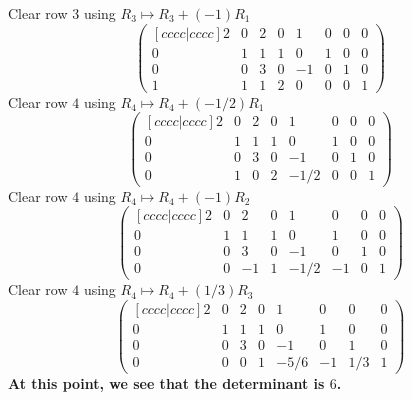 \documentclass{article}
\begin{document}
Clear row \(3\) using \(R_3\mapsto R_3+(-1)R_1\)\[\begin{pmatrix}[ c c
c c | c c c c ] 2 & 0 & 2 & 0 & 1 & 0 & 0 & 0 \\ 0 & 1 & 1 & 1 & 0 & 1
& 0 & 0 \\ 0 & 0 & 3 & 0 & -1 & 0 & 1 & 0 \\ 1 & 1 & 1 & 2 & 0 & 0 & 0
& 1 \end{pmatrix}\]Clear row \(4\) using \(R_4\mapsto
R_4+(-1/2)R_1\)\[\begin{pmatrix}[ c c c c | c c c c ] 2 & 0 & 2 & 0 &
1 & 0 & 0 & 0 \\ 0 & 1 & 1 & 1 & 0 & 1 & 0 & 0 \\ 0 & 0 & 3 & 0 & -1 &
0 & 1 & 0 \\ 0 & 1 & 0 & 2 & -1/2 & 0 & 0 & 1 \end{pmatrix}\]Clear row
\(4\) using \(R_4\mapsto R_4+(-1)R_2\)\[\begin{pmatrix}[ c c c c | c c
c c ] 2 & 0 & 2 & 0 & 1 & 0 & 0 & 0 \\ 0 & 1 & 1 & 1 & 0 & 1 & 0 & 0
\\ 0 & 0 & 3 & 0 & -1 & 0 & 1 & 0 \\ 0 & 0 & -1 & 1 & -1/2 & -1 & 0 &
1 \end{pmatrix}\]Clear row \(4\) using \(R_4\mapsto
R_4+(1/3)R_3\)\[\begin{pmatrix}[ c c c c | c c c c ] 2 & 0 & 2 & 0 & 1
& 0 & 0 & 0 \\ 0 & 1 & 1 & 1 & 0 & 1 & 0 & 0 \\ 0 & 0 & 3 & 0 & -1 & 0
& 1 & 0 \\ 0 & 0 & 0 & 1 & -5/6 & -1 & 1/3 & 1 \end{pmatrix}\] {\bf At
this point, we see that the determinant is \(6\).}
\end{document}
